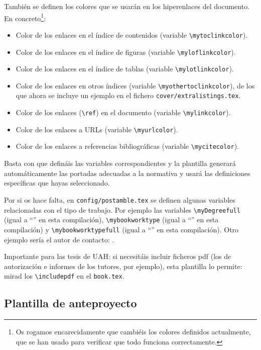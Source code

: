 También se definen los colores que se usarán en los hiperenlaces del
documento. En concreto\footnote{Os rogamos encarecidamente que cambiéis
  los colores definidos actualmente, que se han usado para verificar que
  todo funciona correctamente.}:

\begin{itemize}
\item Color de los enlaces en el índice de contenidos (variable
  \texttt{\textbackslash{}mytoclinkcolor}).
\item Color de los enlaces en el índice de figuras (variable
  \texttt{\textbackslash{}myloflinkcolor}).
\item Color de los enlaces en el índice de tablas (variable
  \texttt{\textbackslash{}mylotlinkcolor}).
\item Color de los enlaces en otros índices (variable
  \texttt{\textbackslash{}myothertoclinkcolor}), de los que ahora se
  incluye un ejemplo en el fichero \texttt{cover/extralistings.tex}.
\item Color de los enlaces (\texttt{\textbackslash{}ref}) en el
  documento (variable \texttt{\textbackslash{}mylinkcolor}).
\item Color de los enlaces a URLs (variable
  \texttt{\textbackslash{}myurlcolor}).
\item Color de los enlaces a referencias bibliográficas (variable
  \texttt{\textbackslash{}mycitecolor}).
\end{itemize}

Basta con que defináis las variables correspondientes y la plantilla
generará automáticamente las portadas adecuadas a la normativa y usará
las definiciones específicas que hayas seleccionado.

Por si os hace falta, en \texttt{config/postamble.tex} se definen
algunas variables relacionadas con el tipo de trabajo. Por ejemplo las
variables \texttt{\textbackslash{}myDegreefull} (igual a
``\myDegreefull'' en esta compilación),
\texttt{\textbackslash{}mybookworktype} (igual a ``\mybookworktype'' en
esta compilación) y \texttt{\textbackslash{}mybookworktypefull} (igual a
``\mybookworktypefull'' en esta compilación). Otro ejemplo sería el
autor de contacto: \contactauthor.

Importante para las tesis de UAH: si necesitáis incluir ficheros pdf
(los de autorización e informes de los tutores, por ejemplo), esta
plantilla lo permite: mirad los \texttt{\textbackslash{}includepdf} en
el \texttt{book.tex}.

\subsection{Plantilla de anteproyecto}
\label{sec:plantilla-de-anteproyecto}

